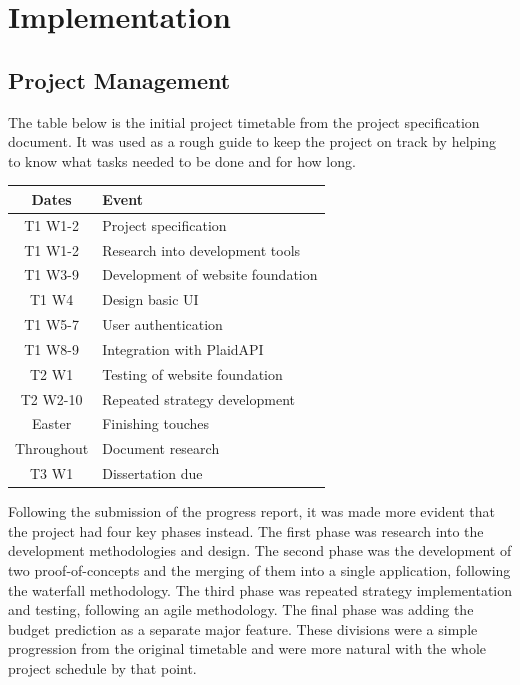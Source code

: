 \chapter{Implementation}
\label{ch:implementation}

\section{Project Management}
The table below is the initial project timetable from the project specification document. It was used as a rough guide to keep the project on track by helping to know what tasks needed to be done and for how long.

\begin{center}
	\begin{tabular}{ | c | l | }
		\hline
		\textbf{Dates} & \textbf{Event} \\ \hline
		T1 W1-2 & Project specification \\ \hline
		T1 W1-2 & Research into development tools \\ \hline
		T1 W3-9 & Development of website foundation \\ \hline
		T1 W4 & Design basic UI \\ \hline
		T1 W5-7 & User authentication \\ \hline
		T1 W8-9 & Integration with PlaidAPI \\ \hline
		T2 W1 & Testing of website foundation \\ \hline
		T2 W2-10 & Repeated strategy development \\ \hline
		Easter & Finishing touches \\ \hline
		Throughout & Document research \\ \hline
		T3 W1 & Dissertation due \\ \hline
	\end{tabular}
\end{center}

Following the submission of the progress report, it was made more evident that the project had four key phases instead. The first phase was research into the development methodologies and design. The second phase was the development of two proof-of-concepts and the merging of them into a single application, following the waterfall methodology. The third phase was repeated strategy implementation and testing, following an agile methodology. The final phase was adding the budget prediction as a separate major feature. These divisions were a simple progression from the original timetable and were more natural with the whole project schedule by that point.

